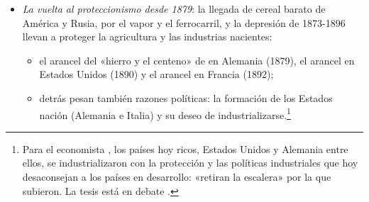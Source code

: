 \documentclass[11pt]{article}
\begin{document}
\begin{itemize}
\begin{enumerate}
\begin{itemize}
    \item Con la paz, los terratenientes pidieron mantener la protección y consiguieron las  (\emph{Corn Laws}, 1815), que gravaban el trigo importado.
    \end{itemize}
  \item \emph{La derogación de las Leyes de Granos (1846)}: el primer ministro  las deroga en plena hambruna irlandesa (1845-1849), con la presión de la Liga contra las Leyes de Granos de . En 1849 caen también las Leyes de Navegación. El Reino Unido se abre de forma unilateral.
  \item \emph{El tratado de  y  (1860)}: entre el Reino Unido y Francia, rebaja los aranceles y lleva la  incondicional.
    \begin{itemize}
    \item Por esa cláusula, toda rebaja arancelaria que una de las partes concede a un tercero se extiende automáticamente a la otra.\footnote{La cláusula de nación más favorecida es habitual en los tratados comerciales: ningún firmante recibe peor trato que el mejor tratado de los demás. Es el artículo~I del GATT .}
    \item Su efecto es multilateralizar: una red de tratados bilaterales con la cláusula extiende las rebajas a toda Europa en los años 60~del siglo~XIX, y con ellas la cooperación en otros campos (ferrocarriles, telégrafos, la Unión Monetaria Latina de 1865).
    \end{itemize}
  \end{enumerate}
\item \emph{La vuelta al proteccionismo desde 1879}: la llegada de cereal barato de América y Rusia, por el vapor y el ferrocarril, y la depresión de 1873-1896 llevan a proteger la agricultura y las industrias nacientes\nocite{Comin2014Historia}:
  \begin{itemize}
  \item el arancel del «hierro y el centeno» de  en Alemania (1879), el arancel  en Estados Unidos (1890) y el arancel  en Francia (1892);
  \item detrás pesan también razones políticas: la formación de los Estados nación (Alemania e Italia) y su deseo de industrializarse.\footnote{Para el economista , los países hoy ricos, Estados Unidos y Alemania entre ellos, se industrializaron con la protección y las políticas industriales que hoy desaconsejan a los países en desarrollo: «retiran la escalera» por la que subieron. La tesis está en debate  .}

\end{itemize}
\end{itemize}
\end{document}
